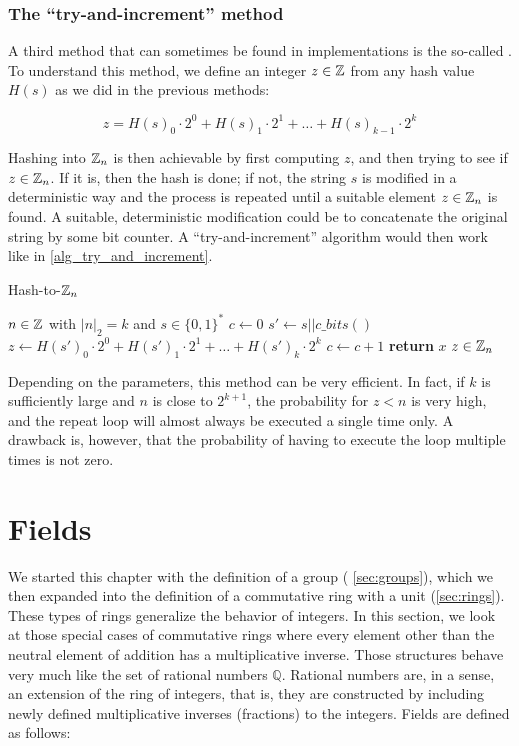 \subsubsection{The ``try-and-increment'' method}\label{def:try_and_increment_hash}

A third method that can sometimes be found in implementations is the so-called . To understand this method, we define an integer $z\in\mathbb{Z}$ from any hash value $H(s)$ as we did in the previous methods:

\begin{equation}
z = H(s)_0\cdot 2^0 + H(s)_1\cdot 2^1 + \ldots + H(s)_{k-1}\cdot 2^{k}
\end{equation}

Hashing into $\mathbb{Z}_n$ is then achievable by first computing $z$, and then trying to see if $z\in\mathbb{Z}_n$. If it is, then the hash is done; if not, the string $s$ is modified in a deterministic way and the process is repeated until a suitable element $z\in\mathbb{Z}_n$ is found. A suitable, deterministic modification could be to concatenate the original string by some bit counter. A ``try-and-increment'' algorithm would then work like in \algname{} \ref{alg_try_and_increment}.
\begin{algorithm}\caption{Hash-to-$\mathbb{Z}_n$}
\label{alg_try_and_increment}
\begin{algorithmic}[0]
\Require $n \in \mathbb{Z}$ with $|n|_2=k$ and $s\in\{0,1\}^*$
\State $c \gets 0$
\Repeat
\State $s' \gets s||c\_bits()$
\State $z \gets H(s')_0\cdot 2^0 + H(s')_1\cdot 2^1 + \ldots + H(s')_{k}\cdot 2^{k}$
\State $c\gets c+1$
\State \textbf{return} $x$
\EndProcedure
\Ensure $ z\in \mathbb{Z}_n$
\end{algorithmic}
\end{algorithm}

Depending on the parameters, this method can be very efficient. In fact, if $k$ is sufficiently large and $n$ is close to $2^{k+1}$, the probability for $z<n$ is very high, and the repeat loop will almost always be executed a single time only. A drawback is, however, that the probability of having to execute the loop multiple times is not zero.

\section{Fields}\label{sec:fields}
We started this chapter with the definition of a group (\secname{} \ref{sec:groups}), which we then expanded into the definition of a commutative ring with a unit (\secname \ref{sec:rings}). These types of rings generalize the behavior of integers. In this section, we look at those special cases of commutative rings where every element other than the neutral element of addition has a multiplicative inverse. Those structures behave very much like the set of rational numbers $\mathbb{Q}$. Rational numbers are, in a sense, an extension of the ring of integers, that is, they are constructed by including newly defined multiplicative inverses (fractions) to the integers. Fields are defined as follows:

